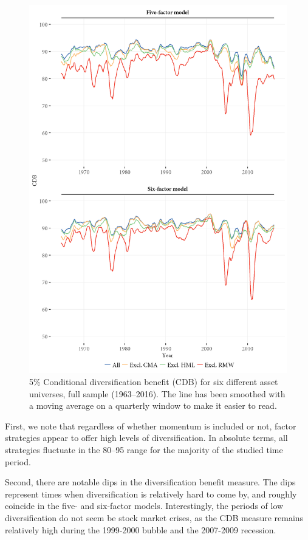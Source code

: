 \begin{figure}
  \centering
  \footnotesize
  \renewcommand{\arraystretch}{1.2}
  \caption{5\% Conditional diversification benefit (CDB) for six different asset universes, full sample (1963--2016). 
  The line has been smoothed with a moving average on a quarterly window to make it easier to read.}
  \label{fig:cdb}
  \includegraphics[scale = 1]{graphics/cdb_5F_6F.png}
\end{figure}

First, we note that regardless of whether momentum is included or not, factor strategies appear to offer high levels of diversification. In absolute terms, all strategies fluctuate in the 80--95 range for the majority of the studied time period. 

Second, there are notable dips in the diversification benefit measure. The dips represent times when diversification is relatively hard to come by, and roughly coincide in the five- and six-factor models. Interestingly, the periods of low diversification do not seem be stock market crises, as the CDB measure remains relatively high during the 1999-2000 bubble and the 2007-2009 recession.

